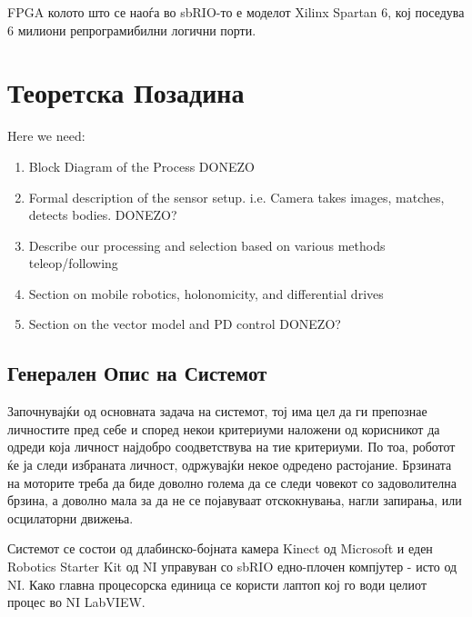 \documentclass[12pt]{article}
\begin{document}
		FPGA колото што се наоѓа во sbRIO-то е моделот Xilinx Spartan 6, кој поседува 6 милиони репрограмибилни логични порти.

\newpage

\section{Теоретска Позадина}
  Here we need:
  \begin{enumerate}
    \item Block Diagram of the Process DONEZO
    \item Formal description of the sensor setup. i.e. Camera takes images, matches, detects bodies. DONEZO?
    \item Describe our processing and selection based on various methods teleop/following
    \item Section on mobile robotics, holonomicity, and differential drives
    \item Section on the vector model and PD control DONEZO?
    \end{enumerate}

  \subsection{Генерален Опис на Системот}
  \label{sec:general_desc}
    Започнувајќи од основната задача на системот, тој има цел да ги препознае личностите пред себе и според некои критериуми наложени од корисникот да одреди која личност најдобро соодветствува на тие критериуми. По тоа, роботот ќе ја следи избраната личност, одржувајќи некое одредено растојание. Брзината на моторите треба да биде доволно голема да се следи човекот со задоволителна брзина, а доволно мала за да не се појавуваат отскокнувања, нагли запирања, или осцилаторни движења.

    Системот се состои од длабинско-бојната камера Kinect од Microsoft и еден Robotics Starter Kit од NI управуван со sbRIO едно-плочен компјутер - исто од NI. Како главна процесорска единица се користи лаптоп кој го води целиот процес во NI LabVIEW.
\end{document}
